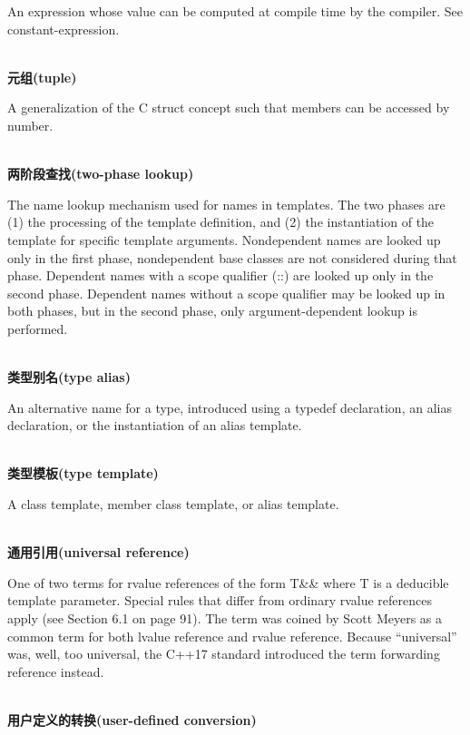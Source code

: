 An expression whose value can be computed at compile time by the compiler. See constant-expression.

\hspace*{\fill} \\ %
\noindent
\textbf{元组(tuple)}

A generalization of the C struct concept such that members can be accessed by number.

\hspace*{\fill} \\ %
\noindent
\textbf{两阶段查找(two-phase lookup)}

The name lookup mechanism used for names in templates. The two phases are (1) the processing of the template definition, and (2) the instantiation of the template for specific template arguments. Nondependent names are looked up only in the first phase, nondependent base classes are not considered during that phase. Dependent names with a scope qualifier (::) are looked up only in the second phase. Dependent names without a scope qualifier may be looked up in both phases, but in the second phase, only argument-dependent lookup is performed.

\hspace*{\fill} \\ %
\noindent
\textbf{类型别名(type alias)}

An alternative name for a type, introduced using a typedef declaration, an alias declaration, or the instantiation of an alias template.

\hspace*{\fill} \\ %
\noindent
\textbf{类型模板(type template)}

A class template, member class template, or alias template.

\hspace*{\fill} \\ %
\noindent
\textbf{通用引用(universal reference)}

One of two terms for rvalue references of the form T\&\& where T is a deducible template parameter. Special rules that differ from ordinary rvalue references apply (see Section 6.1 on page 91). The term was coined by Scott Meyers as a common term for both lvalue reference and rvalue reference. Because “universal” was, well, too universal, the C++17 standard introduced the term forwarding reference instead.

\hspace*{\fill} \\ %
\noindent
\textbf{用户定义的转换(user-defined conversion)}

